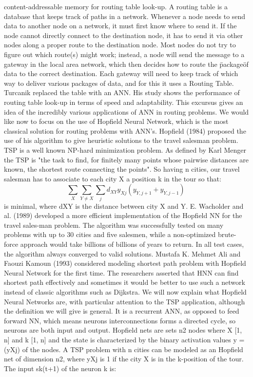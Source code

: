 content-addressable memory for routing table look-up.
A routing table is a database that keeps track of paths in a network. Whenever a node needs to send 
data to another node on a network, it must first know where to send it. If the node cannot directly 
connect to the destination node, it has to send it via other nodes along a proper route to the 
destination node. Most nodes do not try to figure out which route(s) might work; instead, a node will 
send the message to a gateway in the local area network, which then decides how to route the \"package\"
of data to the correct destination. Each gateway will need to keep track of which way to deliver 
various packages of data, and for this it uses a Routing Table. 
Turcanik replaced the table with an ANN. His study shows the performance of routing table look-up in 
terms of speed and adaptability.
\bigbreak
This excursus gives an idea of the incredibly various applications of ANN in routing problems.
We would like now to focus on the use of Hopfield Neural Network, which is the most classical solution 
for routing problems with ANN's.
\bigbreak
Hopfield (1984) proposed the use of his algorithm to give heuristic solutions to the travel salesman 
problem.
TSP is a well known NP-hard minimization problem. As defined by Karl Menger the TSP is "the task to 
find, for finitely many points whose pairwise distances are known, the shortest route connecting the 
points". So having n cities, our travel salesman has to associate to each city X a position k in the 
tour so that: 
\begin{equation*}
    \sum_{X}\sum_{Y\neq X}\sum_{j}{d_{XY}y_{Xj}(y_{Y,j+1}+y_{Y,j-1})\ }
\end{equation*}
is minimal, where dXY is the distance between city X and Y.
\bigbreak
E. Wacholder and al. (1989) developed a more efficient implementation of the Hopfield NN for the travel
sales-man problem. The algorithm was successfully tested on many problems with up to 30 cities and five
salesmen, while a non-optimized brute-force approach would take billions of billions of years to 
return. In all test cases, the algorithm always converged to valid solutions.
\bigbreak
Mustafa K. Mehmet Ali and Faouzi Kamoun (1993) considered modeling shortest path problem with Hopfield 
Neural Network for the first time. The researchers asserted that HNN can find shortest path effectively
and sometimes it would be better to use such a network instead of classic algorithms such as Dijkstra.
\bigbreak
We will now explain what Hopfield Neural Networks are, with particular attention to the TSP application,
although the definition we will give is general.
It is a recurrent ANN, as opposed to feed forward NN, which means neurons interconnections forms a 
directed cycle, so neurons are both input and output. 
Hopfield nets are sets n2 nodes where X [1, n] and k  [1, n] and the state is characterized by the 
binary activation values y = (yXj) of the nodes.
A TSP problem with n cities can be modeled as an Hopfield net of dimension n2, where yXj is 1 if the 
city X is in the k-position of the tour.
\bigbreak
The input sk(t+1) of the neuron k is:


